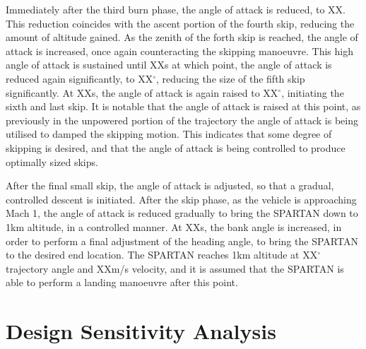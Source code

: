 Immediately after the third burn phase, the angle of attack is reduced, to XX. This reduction coincides with the ascent portion of the fourth skip, reducing the amount of altitude gained. 
As the zenith of the forth skip is reached, the angle of attack is increased, once again counteracting the skipping manoeuvre. 
This high angle of attack is sustained until XXs at which point, the angle of attack is reduced again significantly, to XX$^\circ$, reducing the size of the fifth skip significantly. At XXs, the angle of attack is again raised to XX$^\circ$, initiating the sixth and last skip. 
It is notable that the angle of attack is raised at this point, as previously in the unpowered portion of the trajectory the angle of attack is being utilised to damped the skipping motion. This indicates that some degree of skipping is desired, and that the angle of attack is being controlled to produce optimally sized skips. 


After the final small skip, the angle of attack is adjusted, so that a gradual, controlled descent is initiated. 
After the skip phase, as the vehicle is approaching Mach 1, the angle of attack is reduced gradually to bring the SPARTAN down to 1km altitude, in a controlled manner. At XXs, the bank angle is increased, in order to perform a final adjustment of the heading angle, to bring the SPARTAN to the desired end location. 
The SPARTAN reaches 1km altitude at XX$^\circ$ trajectory angle and XXm/s velocity, and it is assumed that the SPARTAN is able to perform a landing manoeuvre after this point. 








\section{Design Sensitivity Analysis}

